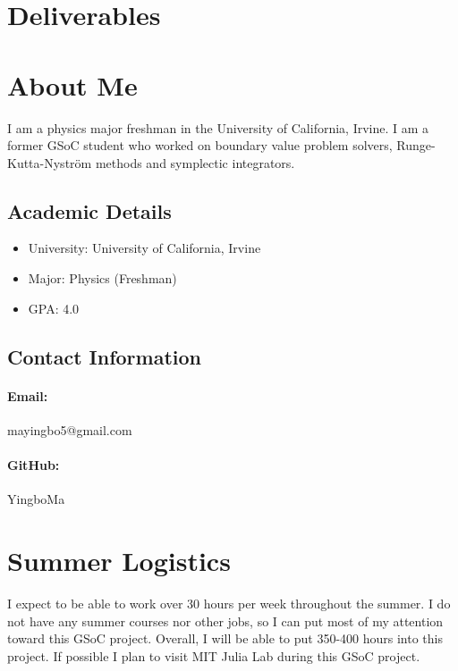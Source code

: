 \documentclass[12pt]{article}
\begin{document}
\section{Deliverables}

\section{About Me}
I am a physics major freshman in the University of California, Irvine. I am a
former GSoC student who worked on boundary value problem solvers,
Runge-Kutta-Nystr{\"o}m methods and symplectic integrators.

\subsection{Academic Details}
\begin{itemize}
  \item University: University of California, Irvine
  \item Major: Physics (Freshman)
  \item GPA: 4.0
\end{itemize}

\subsection{Contact Information}
\paragraph{Email:} mayingbo5@gmail.com
\paragraph{GitHub:} YingboMa

\section{Summer Logistics}
I expect to be able to work over 30 hours per week throughout the summer. I do
not have any summer courses nor other jobs, so I can put most of my attention
toward this GSoC project. Overall, I will be able to put 350-400 hours into
this project. If possible I plan to visit MIT Julia Lab during this GSoC
project.


\end{document}
